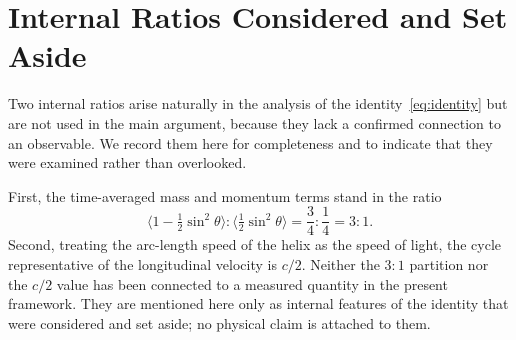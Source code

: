 \documentclass[%
 reprint, amsmath,amssymb, aps, prb, ]{revtex4-2}
\numberwithin{equation}{section}
\begin{document}
\section{Internal Ratios Considered and Set Aside}
\label{app:setaside}

Two internal ratios arise naturally in the analysis of the identity~\eqref{eq:identity} but are not used in the main argument, because they lack a confirmed connection to an observable. We record them here for completeness and to indicate that they were examined rather than overlooked.

First, the time-averaged mass and momentum terms stand in the ratio
\begin{equation}
\langle 1-\tfrac{1}{2}\sin^2\theta\rangle : \langle \tfrac{1}{2}\sin^2\theta\rangle = \frac{3}{4} : \frac{1}{4} = 3:1 .
\label{eq:three-one}
\end{equation}
Second, treating the arc-length speed of the helix as the speed of light, the cycle representative of the longitudinal velocity is $c/2$. Neither the $3:1$ partition nor the $c/2$ value has been connected to a measured quantity in the present framework. They are mentioned here only as internal features of the identity that were considered and set aside; no physical claim is attached to them.
\end{document}
